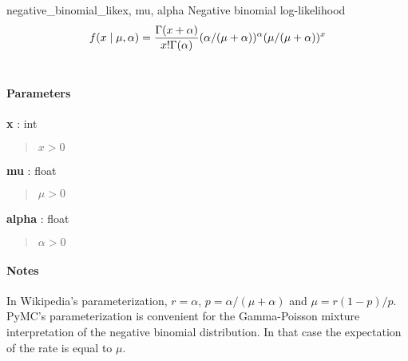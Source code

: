 \hypertarget{pymc.distributions.negative_binomial_like}{}
\begin{funcdesc}{negative\_binomial\_like}{x, mu, alpha}
Negative binomial log-likelihood
\begin{gather}
\begin{split}f(x \mid \mu, \alpha) = \frac{\Gamma(x+\alpha)}{x! \Gamma(\alpha)} (\alpha/(\mu+\alpha))^\alpha (\mu/(\mu+\alpha))^x\end{split}\notag\\\begin{split}\end{split}\notag
\end{gather}
\paragraph{Parameters}
\begin{paramlist}
\item[]\textbf{x} : int
\begin{quote}
$x>0$
\end{quote}

\item[]\textbf{mu} : float
\begin{quote}
$\mu>0$
\end{quote}

\item[]\textbf{alpha} : float
\begin{quote}
$\alpha>0$
\end{quote}
\end{paramlist}

\paragraph{Notes}
In Wikipedia's parameterization, $r=\alpha$, $p=\alpha/(\mu+\alpha)$ and $\mu=r(1-p)/p$.
PyMC's parameterization is convenient for the Gamma-Poisson mixture interpretation
of the negative binomial distribution. In that case the expectation of the rate
is equal to $\mu$.
\end{funcdesc}

